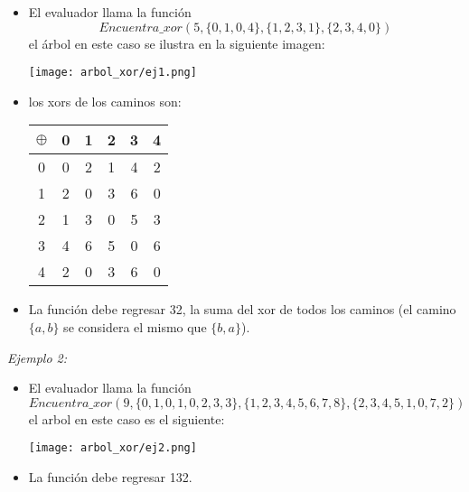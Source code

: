 \documentclass[12pt]{scrartcl}
\begin{document}
        \begin{itemize}
            \item  El evaluador llama la función 
            $$Encuentra\_xor(5, \{0, 1, 0, 4\}, \{1, 2, 3, 1\}, \{2, 3, 4, 0\})$$ 
            el árbol en este caso se ilustra en la siguiente imagen:
            
            \begin{center}
                \texttt{[image: arbol\_xor/ej1.png]}
            \end{center}
            
            \item los xors de los caminos son:

                \begin{center}
                    
                \begin{tabular}{|c||c|c|c|c|c|}
                     \hline
                      $\oplus$ & 0 & 1 & 2 & 3 & 4  \\
                     \hline
                     \hline 
                     0 & 0 & 2 & 1 & 4 & 2 \\
                     \hline 
                     1 & 2 & 0 & 3 & 6 & 0 \\ 
                     \hline
                     2 & 1 & 3 & 0 & 5 & 3 \\
                     \hline
                     3 & 4 & 6 & 5 & 0 & 6 \\
                     \hline
                     4 & 2 & 0 & 3 & 6 & 0 \\
                     \hline
                \end{tabular}
                
                \end{center}
            \item  La función debe regresar 32, la suma del xor de todos los caminos (el camino $\{a, b\}$ se considera el mismo que $\{b, a\}$).
                
        \end{itemize}


        {\itshape Ejemplo 2:}
        \begin{itemize}
            \item El evaluador llama la función $$Encuentra\_xor(9, \{0, 1, 0, 1, 0, 2, 3, 3\}, \{1, 2, 3, 4, 5, 6, 7, 8\}, \{2, 3, 4, 5, 1, 0, 7, 2\})$$ el arbol en este caso es el siguiente:

            \begin{center}
                \texttt{[image: arbol\_xor/ej2.png]}
            \end{center}
            \item La función debe regresar 132.
            
        \end{itemize}
               
\end{document}

